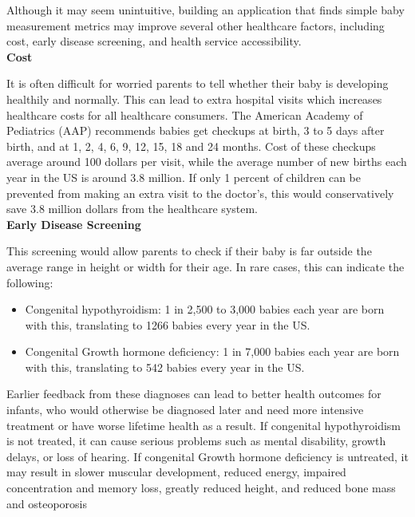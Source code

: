 \documentclass[letterpaper,10pt,draftclsnofoot,onecolumn,compsoc]{IEEEtran}
\begin{document}
\begin{singlespace}
\noindent

\par Although it may seem unintuitive, building an application that finds simple baby measurement metrics may improve several other healthcare factors, including cost, early disease screening, and health service accessibility.\\

\textbf{Cost}
\par It is often difficult for worried parents to tell whether their baby is developing healthily and normally. This can lead to extra hospital visits which increases healthcare costs for all healthcare consumers. The American Academy of Pediatrics (AAP) recommends babies get checkups at birth, 3 to 5 days after birth, and at 1, 2, 4, 6, 9, 12, 15, 18 and 24 months\cite{checkup}. Cost of these checkups average around 100 dollars per visit\cite{cost}, while the average number of new births each year in the US is around 3.8 million\cite{births}. If only 1 percent of children can be prevented from making an extra visit to the doctor's, this would conservatively save 3.8 million dollars from the healthcare system.\\

\textbf{Early Disease Screening}\\
\par This screening would allow parents to check if their baby is far outside the average range in height or width for their age. In rare cases, this can indicate the following:\\

\begin{itemize}
\item Congenital hypothyroidism: 1 in 2,500 to 3,000 babies each year are born with this, translating to 1266 babies every year in the US.\\
\item Congenital Growth hormone deficiency: 1 in 7,000 babies each year are born with this, translating to 542 babies every year in the US. \\
\end{itemize}

\par Earlier feedback from these diagnoses can lead to better health outcomes for infants, who would otherwise be diagnosed later and need more intensive treatment or have worse lifetime health as a result. If congenital hypothyroidism is not treated, it can cause serious problems such as mental disability, growth delays, or loss of hearing. If congenital Growth hormone deficiency is untreated, it may result in slower muscular development, reduced energy, impaired concentration and memory loss, greatly reduced height, and reduced bone mass and osteoporosis\\


\end{singlespace}
\end{document}
